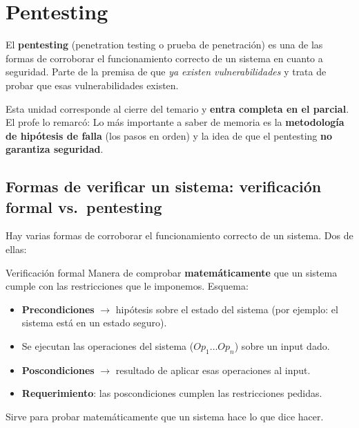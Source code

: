 \documentclass[../main.tex]{subfiles}
\begin{document}
\section{Pentesting}

El \textbf{pentesting} (penetration testing o prueba de penetración) es una de las
formas de corroborar el funcionamiento correcto de un sistema en cuanto a seguridad.
Parte de la premisa de que \emph{ya existen vulnerabilidades} y trata de probar que
esas vulnerabilidades existen.

\begin{destacado}
Esta unidad corresponde al cierre del temario y \textbf{entra completa en el parcial}.
El profe lo remarcó: 
Lo más importante a saber de memoria es la \textbf{metodología de hipótesis de falla}
(los pasos en orden) y la idea de que el pentesting \textbf{no garantiza seguridad}.
\end{destacado}

\subsection{Formas de verificar un sistema: verificación formal vs.\ pentesting}

Hay varias formas de corroborar el funcionamiento correcto de un sistema. Dos de ellas:

\begin{definicion}{Verificación formal}
Manera de comprobar \textbf{matemáticamente} que un sistema cumple con las restricciones
que le imponemos. Esquema:
\begin{itemize}
    \item \textbf{Precondiciones} $\rightarrow$ hipótesis sobre el estado del sistema
    (por ejemplo: el sistema está en un estado seguro).
    \item Se ejecutan las operaciones del sistema ($Op_1 \dots Op_n$) sobre un input dado.
    \item \textbf{Poscondiciones} $\rightarrow$ resultado de aplicar esas operaciones al input.
    \item \textbf{Requerimiento}: las poscondiciones cumplen las restricciones pedidas.
\end{itemize}
Sirve para probar matemáticamente que un sistema hace lo que dice hacer.
\end{definicion}
\end{document}
